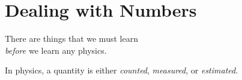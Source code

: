 %
%
%
%
%
%
%
%
%
%
%
\chapter{Dealing with Numbers}
%
%
\begin{center}
  There are things that we must learn\\
  \emph{before} we learn any physics.
\end{center}

In physics, a quantity is either \emph{counted}, \emph{measured},
or \emph{estimated}.

%
%
%
\begin{figure}[ht]
  \centering
  \begin{subfigure}{.3\textwidth}
    \centering
  \end{subfigure}
  \begin{subfigure}{.3\textwidth}
    \centering
  \end{subfigure}
  \begin{subfigure}{.33\textwidth}
    \centering
    \end{subfigure}
\end{figure}  
%

